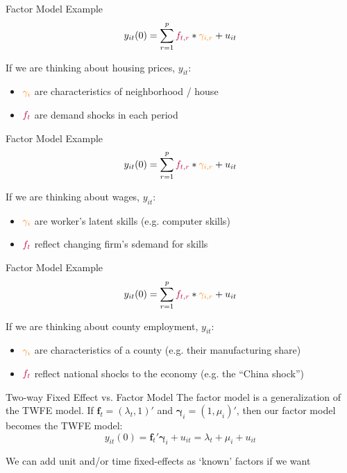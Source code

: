 \documentclass[aspectratio=169,t,11pt,table]{beamer}
\begin{document}
\begin{frame}{Factor Model Example}
  \vspace*{-\bigskipamount}
  $$
    y_{it}(0) = \sum_{r = 1}^{p} {\color{purple}f_{t,r}} * {\color{orange}\gamma_{i,r}} + u_{it}
  $$

  \bigskip
  If we are thinking about housing prices, $y_{it}$:
  \begin{itemize}
    \item ${\color{orange}\gamma_i}$ are characteristics of neighborhood / house
    \item ${\color{purple}f_{t}}$ are demand shocks in each period
  \end{itemize}
\end{frame}

\begin{frame}{Factor Model Example}
  \vspace*{-\bigskipamount}
  $$
    y_{it}(0) = \sum_{r = 1}^{p} {\color{purple}f_{t,r}} * {\color{orange}\gamma_{i,r}} + u_{it}
  $$

  \bigskip
  If we are thinking about wages, $y_{it}$:
  \begin{itemize}
    \item ${\color{orange}\gamma_i}$ are worker's latent skills (e.g. computer skills)
    \item ${\color{purple}f_{t}}$ reflect changing firm's sdemand for skills
  \end{itemize}
\end{frame}

\begin{frame}{Factor Model Example}
  \vspace*{-\bigskipamount}
  $$
    y_{it}(0) = \sum_{r = 1}^{p} {\color{purple}f_{t,r}} * {\color{orange}\gamma_{i,r}} + u_{it}
  $$

  \bigskip
  If we are thinking about county employment, $y_{it}$:
  \begin{itemize}
    \item ${\color{orange}\gamma_i}$ are characteristics of a county (e.g. their manufacturing share)
    \item ${\color{purple}f_{t}}$ reflect national shocks to the economy (e.g. the ``China shock'')
  \end{itemize}
\end{frame}

\begin{frame}{Two-way Fixed Effect vs. Factor Model}
  The factor model is a generalization of the TWFE model. If $\bm{f}_{t} = (\lambda_t, 1)'$ and $\bm{\gamma}_i = (1, \mu_i)'$, then our factor model becomes the TWFE model:
  $$
    y_{it}(0) = \bm{f}_t' \bm{\gamma}_i + u_{it} = \lambda_t + \mu_i + u_{it}
  $$
  
  \bigskip
  We can add unit and/or time fixed-effects as `known' factors if we want
\end{frame}
\end{document}
